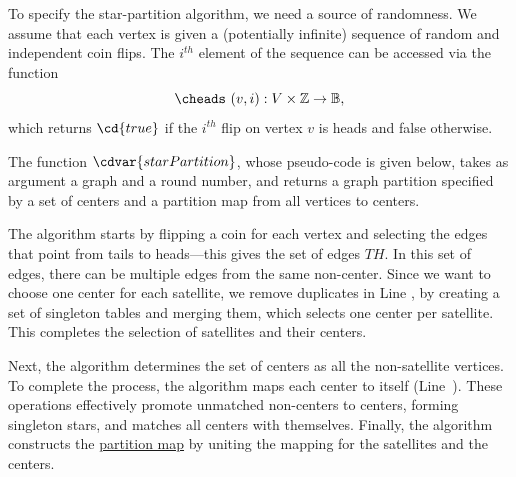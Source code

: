 \begin{flex}
\begin{algorithm}
\label{alg:graphcon::star-partition}

To specify the star-partition algorithm, we need
a source of randomness.
%
We assume that each vertex is given a (potentially infinite) sequence
of random and independent coin flips. The $i^{th}$ element of the
sequence can be accessed via the function
\[
\cheads~(v,i) : V \times \mathbb{Z} \to \mathbb{B}, 
\]
which returns $\cd{true}$ if the $i^{th}$ flip on vertex $v$ is heads
and false otherwise. 

The function $\cdvar{starPartition}$, whose pseudo-code is given
below, takes as argument a graph and a round number, and returns a
graph partition specified by a set of centers and a partition map from
all vertices to centers.
%

The algorithm starts by flipping a coin for each vertex and selecting
the edges that point from tails to heads---this gives the set of edges
$\mathit{TH}$.
%
In this set of edges, there can be multiple edges from the same
non-center. Since we want to choose one center for each satellite, we
remove duplicates in Line \linegcstarmerge{}, by creating a set of
singleton tables and merging them, which selects one center per
satellite.
%
This completes the selection of satellites and their centers. 
%

Next, the algorithm determines the set of centers as all the
non-satellite vertices.
%
To complete the process, the algorithm maps each center to itself
(Line~\linegcstarself{}).
%
These operations effectively promote unmatched non-centers to centers,
forming singleton stars, and matches all centers with themselves.
%
Finally, the algorithm constructs the
%
\href{def:graphcon::intro::prelim::partition-map}{partition map} 
%
by uniting the mapping for the satellites and the centers.
%


\end{algorithm}
\end{flex}
